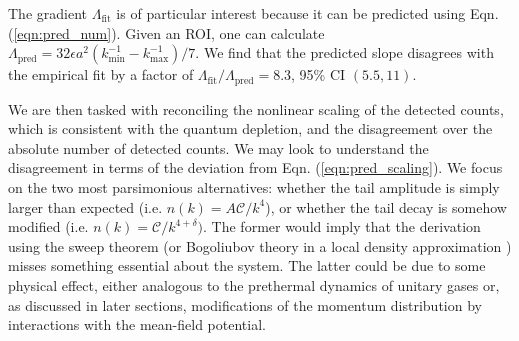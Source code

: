 	The gradient $\Lambda_\textrm{fit}$ is of particular interest because it can be predicted using Eqn. (\ref{eqn:pred_num}).
	Given an ROI, one can calculate $\Lambda_\textrm{pred} = 32 \epsilon a^2(k_{\textrm{min}}^{-1}-k_{\textrm{max}}^{-1})/7$.
	We find that the predicted slope disagrees with the empirical fit by a factor of $\Lambda_\textrm{fit}/\Lambda_\textrm{pred}= 8.3$, 95\% CI $(5.5,11)$.


	We are then tasked with reconciling the nonlinear scaling of the detected counts, which is consistent with the quantum depletion, and the disagreement over the absolute number of detected counts.
	We may look to understand the disagreement in terms of the deviation from Eqn. (\ref{eqn:pred_scaling}).
	We focus on the two most parsimonious alternatives: whether the tail amplitude is simply larger than expected (i.e. $n(k)=A\mathcal{C}/k^4$), or whether the tail decay is somehow modified (i.e. $n(k)=\mathcal{C}/k^{4+\delta})$.
	The former would imply that the derivation using the sweep theorem (or Bogoliubov theory in a local density approximation \cite{Chang16}) misses something essential about the system.
	The latter could be due to some physical effect, either analogous to the prethermal dynamics of unitary gases \cite{Makotyn14,Eigen18,Colussi20,Kira15_coherent,Smith14} or, as discussed in later sections, modifications of the momentum distribution by interactions with the mean-field potential.
	
